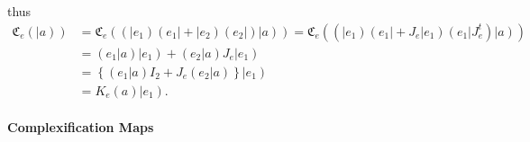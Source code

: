 \documentclass[aps,preprint]{revtex4}%
\begin{document}
thus
\begin{align}
\mathfrak{C}_{e}\left(  \left\vert a\right)  \right)   &  =\mathfrak{C}%
_{e}\left(  \left(  \left\vert e_{1}\right)  \left(  e_{1}\right\vert
+\left\vert e_{2}\right)  \left(  e_{2}\right\vert \right)  \left\vert
a\right)  \right)  =\mathfrak{C}_{e}\left(  \left(  \left\vert e_{1}\right)
\left(  e_{1}\right\vert +J_{e}\left\vert e_{1}\right)  \left(  e_{1}%
\right\vert J_{e}^{t}\right)  \left\vert a\right)  \right) \\
&  =\left(  \left.  e_{1}\right\vert a\right)  \left\vert e_{1}\right)
+\left(  \left.  e_{2}\right\vert a\right)  J_{e}\left\vert e_{1}\right) \\
&  =\left\{  \left(  \left.  e_{1}\right\vert a\right)  I_{2}+J_{e}\left(
\left.  e_{2}\right\vert a\right)  \right\}  \left\vert e_{1}\right) \\
&  =K_{e}\left(  a\right)  \left\vert e_{1}\right)  .
\end{align}


\paragraph{Complexification Maps}
\end{document}
